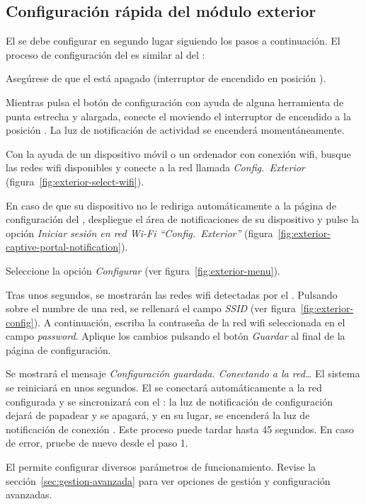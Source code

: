 \subsection{Configuración rápida del módulo exterior}

El \MEE se debe configurar en segundo lugar siguiendo los pasos a continuación. El proceso de configuración del \MEE es similar al del \MIE:

\begin{enumeratecompact}

\item Asegúrese de que el \ME está apagado (interruptor de encendido  en posición \off).

\item Mientras pulsa el botón de configuración  con ayuda de alguna herramienta de punta estrecha y alargada, conecte el \ME moviendo el interruptor de encendido  a la posición \on. La luz de notificación de actividad  se encenderá momentáneamente. 

\item Con la ayuda de un dispositivo móvil o un ordenador con conexión wifi, busque las redes wifi disponibles y conecte a la red llamada \emph{Config.~Exterior} (figura~\ref{fig:exterior-select-wifi}).

\item En caso de que su dispositivo no le rediriga automáticamente a la página de configuración del \ME, despliegue el área de notificaciones de su dispositivo y pulse la opción \emph{Iniciar sesión en red Wi-Fi ``Config.~Exterior''} (figura~\ref{fig:exterior-captive-portal-notification}).

\item Seleccione la opción \emph{Configurar} (ver figura~\ref{fig:exterior-menu}).

\item Tras unos segundos, se mostrarán las redes wifi detectadas por el \ME. Pulsando sobre el numbre de una red, se rellenará el campo \emph{SSID} (ver figura~\ref{fig:exterior-config}). A continuación, escriba la contraseña de la red wifi seleccionada en el campo \emph{password}. Aplique los cambios pulsando el botón \emph{Guardar} al final de la página de configuración.

\item Se mostrará el mensaje \emph{Configuración guardada. Conectando a la red\ldots} El sistema se reiniciará en unos segundos. El \ME se conectará automáticamente a la red configurada y se sincronizará con el \MIE: la luz de notificación de configuración  dejará de papadear y se apagará, y en su lugar, se encenderá la luz de notificación de conexión . Este proceso puede tardar hasta 45 segundos. En caso de error, pruebe de nuevo desde el paso 1.

\end{enumeratecompact}



El \CMS permite configurar diversos parámetros de funcionamiento. Revise la sección~\ref{sec:gestion-avanzada} para ver opciones de gestión y configuración avanzadas.
\tipend


